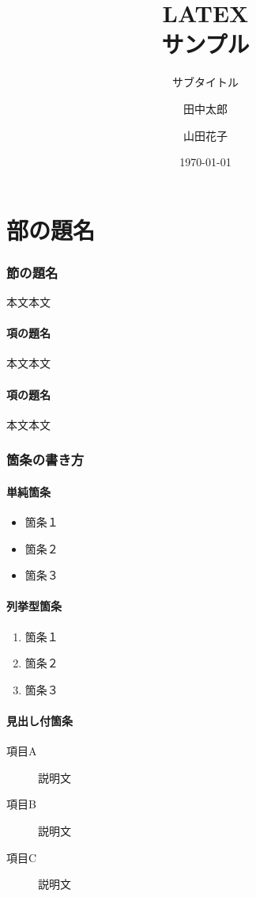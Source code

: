 \documentclass{jsarticle}					%
\title{LATEX \\ サンプル}	%
\subtitle{サブタイトル}							%
\author{田中太郎 \and 山田花子}				%
\date{\today}									%
\begin{document}
\maketitle			%

\tableofcontents    	%

\pagebreak

\part{部の題名}
\section{節の題名}
	本文本文

\subsection{項の題名}
	本文本文

\subsection{項の題名}
	本文本文

\section{箇条の書き方}
\subsection{単純箇条}
	\begin{itemize}		%
		\item 箇条１
		\item 箇条２
		\item 箇条３
	\end{itemize}

\subsection{列挙型箇条}
	\begin{enumerate}		%
		\item 箇条１
		\item 箇条２
		\item 箇条３
	\end{enumerate}

\subsection{見出し付箇条}
	\begin{description}		%
		\item[項目A] 説明文
		\item[項目B] 説明文
		\item[項目C] 説明文
	\end{description}
\end{document}
